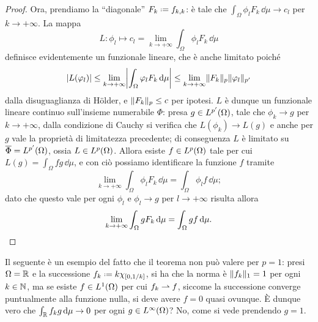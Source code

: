 \begin{proof}
    Ora, prendiamo la ``diagonale'' $F_k\defeq f_{k,k}$: è tale che $\int_\Omega\phi_lF_k\,\dd\mu\to c_l$ per $k\to+\infty$.
    La mappa
    \begin{equation}
        L\colon \phi_l\mapsto c_l=\lim_{k\to+\infty}\int_\Omega \phi_lF_k\,\dd\mu
    \end{equation}
    definisce evidentemente un funzionale lineare, che è anche limitato poich\'e
    \begin{equation}
        \abs{L(\phi_l)}\le
        \lim_{k\to+\infty}\abs[\bigg]{\int_\Omega \phi_lF_k\,\dd\mu}\le
        \lim_{k\to+\infty}\norm{F_k}_p\norm{\phi_l}_{p'}
    \end{equation}
    dalla disuguaglianza di Hölder, e $\norm{F_k}_p\le c$ per ipotesi.
    $L$ è dunque un funzionale lineare continuo sull'insieme numerabile $\Phi$: presa $g\in\leb[p']{\Omega}$, tale che $\phi_k\to g$ per $k\to+\infty$, dalla condizione di Cauchy si verifica che $L(\phi_k)\to L(g)$ e anche per $g$ vale la proprietà di limitatezza precedente; di conseguenza $L$ è limitato su $\clos{\Phi}=\leb[p']{\Omega}$, ossia $L\in\leb[p]{\Omega}$.
    Allora esiste $f\in\leb[p]{\Omega}$ tale per cui $L(g)=\int_\Omega fg\,\dd\mu$, e con ciò possiamo identificare la funzione $f$ tramite
    \begin{equation}
        \lim_{k\to+\infty}\int_\Omega \phi_lF_k\,\dd\mu=\int_\Omega \phi_lf\,\dd\mu;
    \end{equation}
    dato che questo vale per ogni $\phi_l$ e $\phi_l\to g$ per $l\to+\infty$ risulta allora
    \begin{equation}
        \lim_{k\to+\infty}\int_\Omega gF_k\,\dd\mu=\int_\Omega gf\,\dd\mu.\qedhere
    \end{equation}
\end{proof}
Il seguente è un esempio del fatto che il teorema non può valere per $p=1$: presi $\Omega=\R$ e la successione $f_k\defeq k\chi_{[0,1/k]}$, si ha che la norma è $\norm{f_k}_1=1$ per ogni $k\in\N$, ma se esiste $f\in\leb[1]{\Omega}$ per cui $f_k\weakto f$, siccome la successione converge puntualmente alla funzione nulla, si deve avere $f=0$ quasi ovunque.
È dunque vero che $\int_{\R}f_kg\,\dd\mu\to 0$ per ogni $g\in\leb[\infty]{\Omega}$?
No, come si vede prendendo $g=1$.

